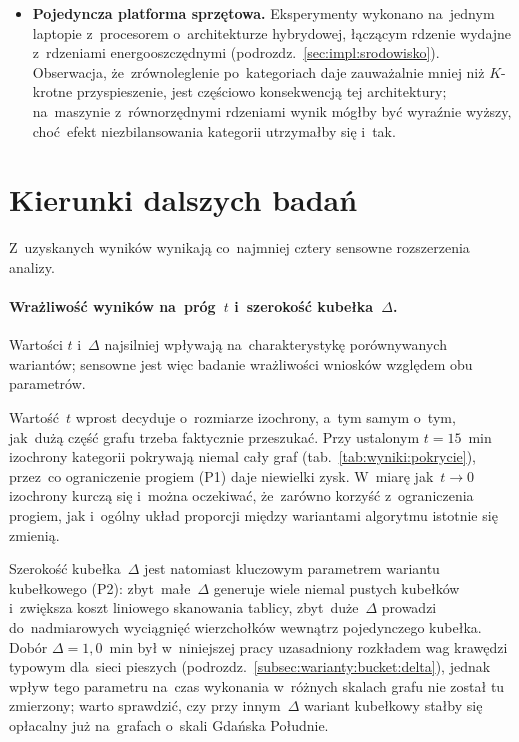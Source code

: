 \begin{itemize}
        (Python~3.12, podrozdz.~\ref{sec:impl:srodowisko}); część
        nieoptymalnych własności kolejki kubełkowej (np.\ koszt stały
        pojedynczej operacji) zachowuje się tu inaczej niż w~języku
        kompilowanym ze~ścisłą kontrolą układu pamięci. Wartości bezwzględne
        czasów nie są więc bezpośrednio porównywalne z~implementacjami
        w~C/C++ albo Rust; istotny jest dla nich stosunek czasów
        między wariantami, a~nie sam czas wykonania.
  \item \textbf{Pojedyncza platforma sprzętowa.}
        Eksperymenty wykonano na~jednym laptopie z~procesorem o~architekturze
        hybrydowej, łączącym rdzenie wydajne z~rdzeniami energooszczędnymi
        (podrozdz.~\ref{sec:impl:srodowisko}). Obserwacja, że~zrównoleglenie
        po~kategoriach daje zauważalnie mniej niż $K$-krotne przyspieszenie,
        jest częściowo konsekwencją tej architektury; na~maszynie z~równorzędnymi
        rdzeniami wynik mógłby być wyraźnie wyższy, choć~efekt
        niezbilansowania kategorii utrzymałby się i~tak.
\end{itemize}

\section{Kierunki dalszych badań}
\label{sec:podsum:dalsze}

Z~uzyskanych wyników wynikają co~najmniej cztery sensowne rozszerzenia
analizy.

\paragraph{Wrażliwość wyników na~próg~$t$ i~szerokość kubełka~$\Delta$.}
Wartości $t$ i~$\Delta$ najsilniej wpływają na~charakterystykę
porównywanych wariantów; sensowne jest więc badanie
wrażliwości wniosków względem obu parametrów.

Wartość~$t$ wprost decyduje o~rozmiarze izochrony, a~tym samym o~tym,
jak~dużą część grafu trzeba faktycznie przeszukać. Przy ustalonym
$t=15$~min izochrony kategorii pokrywają niemal cały graf
(tab.~\ref{tab:wyniki:pokrycie}), przez~co ograniczenie progiem (P1)
daje niewielki zysk. W~miarę jak~$t\to 0$ izochrony kurczą się
i~można oczekiwać, że~zarówno korzyść z~ograniczenia progiem, jak
i~ogólny układ proporcji między wariantami algorytmu istotnie się
zmienią.

Szerokość kubełka~$\Delta$ jest natomiast kluczowym parametrem
wariantu kubełkowego (P2): zbyt~małe~$\Delta$ generuje wiele
niemal pustych kubełków i~zwiększa koszt liniowego skanowania
tablicy, zbyt~duże~$\Delta$ prowadzi do~nadmiarowych wyciągnięć
wierzchołków wewnątrz pojedynczego kubełka. Dobór $\Delta=1{,}0$~min był
w~niniejszej pracy uzasadniony rozkładem wag krawędzi typowym
dla~sieci pieszych (podrozdz.~\ref{subsec:warianty:bucket:delta}),
jednak wpływ tego parametru na~czas wykonania w~różnych skalach
grafu nie został tu zmierzony; warto sprawdzić, czy przy innym~$\Delta$
wariant kubełkowy stałby się opłacalny już na~grafach o~skali Gdańska Południe.

